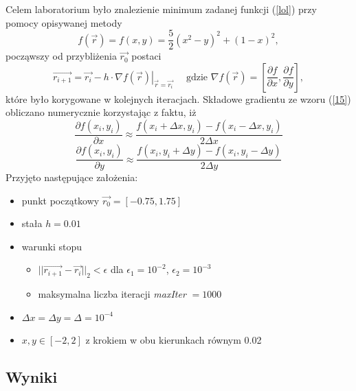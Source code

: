 Celem laboratorium było znalezienie minimum zadanej funkcji (\ref{lol}) przy pomocy opisywanej metody
\begin{equation}
f(\vec{r}) =  f(x, y) = \frac{5}{2} (x^2 - y)^2 + (1 - x )^2,
\label{lol}
\end{equation}
począwszy od przybliżenia $\vec{r_0}$ postaci
\begin{equation}
\vec{r_{i+1}} = \vec{r_i} - h\cdot\nabla \left.f(\vec{r})\right|_{\vec{r} = \vec{r_i}} \quad \text{ gdzie } \nabla f(\vec{r}) = \left[\frac{\partial f}{\partial x}, \frac{\partial f}{\partial y}\right],
\label{15}
\end{equation}
które było korygowane w kolejnych iteracjach.
Składowe gradientu ze wzoru (\ref{15}) obliczano numerycznie korzystając z faktu, iż
\begin{equation}
\frac{\partial f(x_i,y_i)}{\partial  x} \approx \frac{f(x_i + \Delta x, y_i) - f(x_i - \Delta x, y_i)}{2 \Delta x}
\end{equation}
\begin{equation}
\frac{\partial f(x_i,y_i)}{\partial y} \approx \frac{f(x_i, y_i  + \Delta y) - f(x_i, y_i - \Delta y)}{2 \Delta y}
\end{equation}
Przyjęto następujące założenia:
\begin{itemize}
	\item punkt początkowy $\vec{r_0} = [-0.75, 1.75]$
	\item stała $h = 0.01$
	\item warunki stopu \begin{itemize}
		\item $||\vec{r_{i+1}} - \vec{r_i}||_2 < \epsilon$ dla $\epsilon_1 = 10^{-2}$, $\epsilon_2 = 10^{-3}$
		\item maksymalna liczba iteracji \textit{maxIter} $ = 1000 $
	\end{itemize}
	\item $\Delta x = \Delta y = \Delta = 10^{-4}$
	\item  $x, y \in [-2, 2]$ z krokiem w obu kierunkach równym 0.02
\end{itemize}


\newpage
\subsection{Wyniki}

